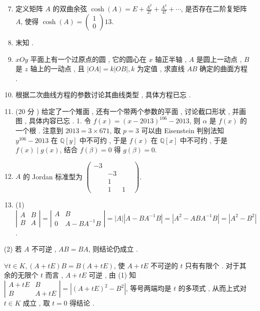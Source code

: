 \documentclass[10pt]{article}
\begin{document}
\begin{enumerate}
  \setcounter{enumi}{6}
  \item  定义矩阵  $A$  的双曲余弦  $\cosh (A)=E+\frac{A^{2}}{2 !}+\frac{A^{4}}{4 !}+\cdots$,  是否存在二阶复矩阵  $A$,  使得  $\cosh (A)=\left(\begin{array}{c}1 \\ 0\end{array}\right) 13$.

  \item  末知 .

  \item $x O y$  平面上有一个过原点的圆 ,  它的圆心在  $x$  轴正半轴 , $A$  是圆上一动点 , $B$  是  $z$  轴上的一动点 ,  且  $|O A|=k|O B|, k$  为定值 ,  求直线  $A B$  确定的曲面方程 .

  \item  根据二次曲线方程的参数讨论其曲线类型 ,  具体方程已忘 .

  \item (20  分 )  给定了一个雉面 ,  还有一个带两个参数的平面 ,  讨论截口形状 ,  并画图 ,  具体内容已忘 . 1.  令  $f(x)=(x-2013)^{106}-2013$,  则  $\alpha$  是  $f(x)$  的一个根 .  注意到  $2013=3 \times 671$,  取  $p=3$  可以由  Eisenstein  判别法知  $y^{106}-2013$  在  $\mathbb{Q}[y]$  中不可约 ,  于是  $f(x)$  在  $\mathbb{Q}[x]$  中不可约 ,  于是  $f(x) \mid g(x)$,  结合  $f(\beta)=0$  得  $g(\beta)=0 .$

  \item $A$  的  Jordan  标准型为  $\left(\begin{array}{llll}-3 & & & \\ & -3 & & \\ & 1 & \\ & 1 & 1\end{array}\right)$.

  \item (1) $\left|\begin{array}{cc}A & B \\ B & A\end{array}\right|=\left|\begin{array}{cc}A & B \\ 0 & A-B A^{-1} B\end{array}\right|=|A|\left|A-B A^{-1} B\right|=\left|A^{2}-A B A^{-1} B\right|=\left|A^{2}-B^{2}\right|$.

\end{enumerate}
(2)  若  $A$  不可逆 , $A B=B A$,  则结论仍成立 .

$\forall t \in K,(A+t E) B=B(A+t E)$,  使  $A+t E$  不可逆的  $t$  只有有限个 .  对于其余的无限个  $t$  而言 , $A+t E$  可逆 ,  由  (1)  知  $\left|\begin{array}{cc}A+t E & B \\ B & A+t E\end{array}\right|=\left|(A+t E)^{2}-B^{2}\right|$,  等号两端均是  $t$  的多项式 ,  从而上式对  $t \in K$  成立 ,  取  $t=0$  得结论 .
\end{document}
